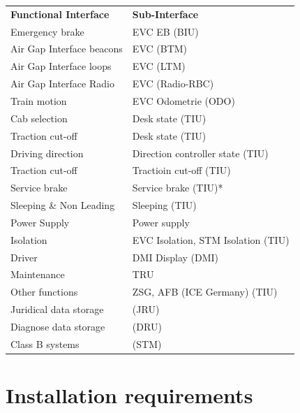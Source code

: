 \documentclass{template/openetcs_article}
\begin{document}
\begin{tabular}{ l l }
\\
    \textbf{Functional Interface}  & \textbf{Sub-Interface} \\ 
    
    Emergency brake &  EVC EB (BIU) \\ 
   	Air Gap Interface beacons &  EVC (BTM) \\
   	Air Gap Interface loops &  EVC (LTM) \\
   	Air Gap Interface Radio &  EVC (Radio-RBC) \\
    Train motion &  EVC Odometrie (ODO)\\
	Cab selection & Desk state (TIU)\\
	Traction cut-off &  Desk state (TIU)\\
	Driving direction &  Direction controller state (TIU)\\
	Traction cut-off &  Tractioin cut-off (TIU)\\
	Service brake &  Service brake (TIU)*\\
	Sleeping \& Non Leading &  Sleeping (TIU)\\
	Power Supply &  Power supply\\
	Isolation &  EVC Isolation, STM Isolation (TIU)\\
	Driver &  DMI Display (DMI)\\
	Maintenance &  TRU\\
	Other functions &  ZSG, AFB (ICE Germany) (TIU)\\
	Juridical data storage &  (JRU)\\
	Diagnose data storage &  (DRU)\\
	Class B systems &  (STM)\\
    
  \end{tabular}



\section{Installation requirements}
\end{document}
